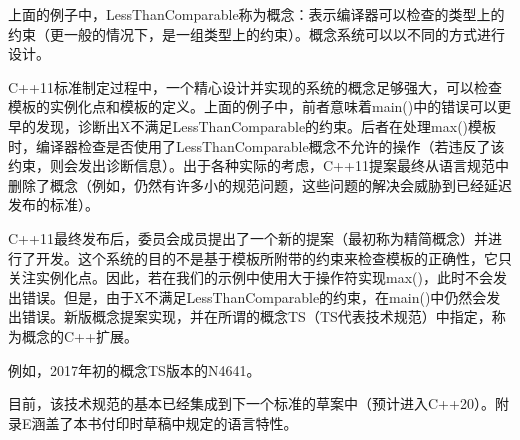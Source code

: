 上面的例子中，LessThanComparable称为概念：表示编译器可以检查的类型上的约束（更一般的情况下，是一组类型上的约束）。概念系统可以以不同的方式进行设计。

C++11标准制定过程中，一个精心设计并实现的系统的概念足够强大，可以检查模板的实例化点和模板的定义。上面的例子中，前者意味着main()中的错误可以更早的发现，诊断出X不满足LessThanComparable的约束。后者在处理max()模板时，编译器检查是否使用了LessThanComparable概念不允许的操作（若违反了该约束，则会发出诊断信息）。出于各种实际的考虑，C++11提案最终从语言规范中删除了概念（例如，仍然有许多小的规范问题，这些问题的解决会威胁到已经延迟发布的标准）。

C++11最终发布后，委员会成员提出了一个新的提案（最初称为精简概念）并进行了开发。这个系统的目的不是基于模板所附带的约束来检查模板的正确性，它只关注实例化点。因此，若在我们的示例中使用大于操作符实现max()，此时不会发出错误。但是，由于X不满足LessThanComparable的约束，在main()中仍然会发出错误。新版概念提案实现，并在所谓的概念TS（TS代表技术规范）中指定，称为概念的C++扩展。

\begin{notice}
例如，2017年初的概念TS版本的N4641。
\end{notice}

目前，该技术规范的基本已经集成到下一个标准的草案中（预计进入C++20）。附录E涵盖了本书付印时草稿中规定的语言特性。














































